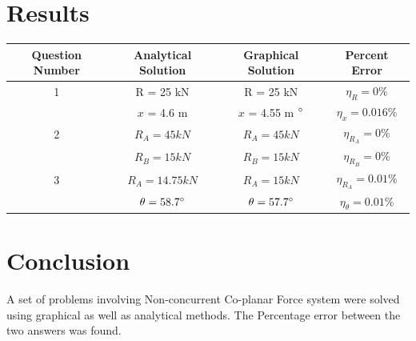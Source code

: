 \documentclass[11pt]{article}
\begin{document}
\pagebreak

\section{Results}

\begin{tabular}{|c|c|c|c|}
	\hline
	Question Number & Analytical Solution & Graphical Solution & Percent Error \\
	\hline
	1 	& R = 25 kN  & R = 25 kN & $\eta_R = 0\%$\\
		& $x$ = 4.6 m & $x$ = 4.55 m $\degree$ & $\eta_x = 0.016 \%$\\
	\hline
	2	& $ R_A = 45 kN $ & $ R_A = 45 kN $ & $\eta_{R_A} = 0\%$ \\
		& $ R_B = 15 kN $ & $ R_B = 15 kN $ & $\eta_{R_B} = 0\%$ \\
	\hline
	3	& $ R_A = 14.75 kN $ & $ R_A = 15 kN $ & $\eta_{R_A} = 0.01\%$ \\
		& $ \theta = 58.7\degree $ & $ \theta = 57.7\degree $ & $\eta_\theta = 0.01\%$ \\
	\hline
\end{tabular}


\section{Conclusion}
A set of problems involving Non-concurrent Co-planar Force system were solved using graphical as well as analytical methods. The Percentage error between the two answers was found.
\end{document}
